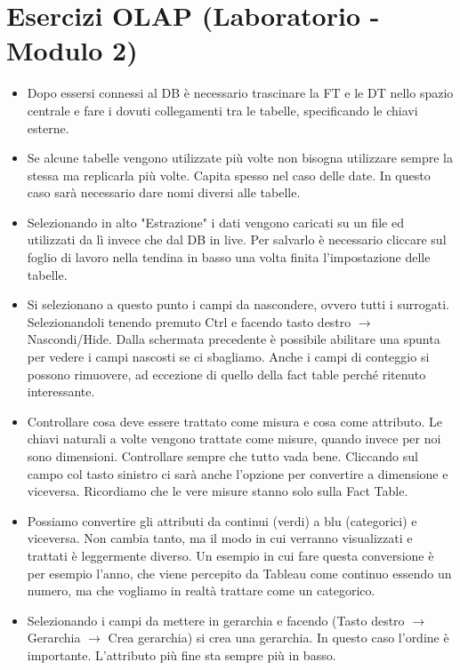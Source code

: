 \section{Esercizi OLAP (Laboratorio - Modulo 2)}
\begin{itemize}
	\item Dopo essersi connessi al DB è necessario trascinare la FT e le DT nello spazio centrale e fare i dovuti collegamenti tra le tabelle, specificando le chiavi esterne.
	\item Se alcune tabelle vengono utilizzate più volte non bisogna utilizzare sempre la stessa ma replicarla più volte. Capita spesso nel caso delle date. In questo caso sarà necessario dare nomi diversi alle tabelle.
	\item Selezionando in alto "Estrazione" i dati vengono caricati su un file ed utilizzati da lì invece che dal DB in live. Per salvarlo è necessario cliccare sul foglio di lavoro nella tendina in basso una volta finita l'impostazione delle tabelle.
	\item Si selezionano a questo punto i campi da nascondere, ovvero tutti i surrogati. Selezionandoli tenendo premuto Ctrl e facendo tasto destro $\xrightarrow{}$ Nascondi/Hide. Dalla schermata precedente è possibile abilitare una spunta per vedere i campi nascosti se ci sbagliamo. Anche i campi di conteggio si possono rimuovere, ad eccezione di quello della fact table perché ritenuto interessante.
	\item Controllare cosa deve essere trattato come misura e cosa come attributo. Le chiavi naturali a volte vengono trattate come misure, quando invece per noi sono dimensioni. Controllare sempre che tutto vada bene. Cliccando sul campo col tasto sinistro ci sarà anche l'opzione per convertire a dimensione e viceversa. Ricordiamo che le vere misure stanno solo sulla Fact Table.
	\item Possiamo convertire gli attributi da continui (verdi) a blu (categorici) e viceversa. Non cambia tanto, ma il modo in cui verranno visualizzati e trattati è leggermente diverso. Un esempio in cui fare questa conversione è per esempio l'anno, che viene percepito da Tableau come continuo essendo un numero, ma che vogliamo in realtà trattare come un categorico.
	\item Selezionando i campi da mettere in gerarchia e facendo (Tasto destro $\xrightarrow{}$ Gerarchia $\xrightarrow{}$ Crea gerarchia) si crea una gerarchia. In questo caso l'ordine è importante. L'attributo più fine sta sempre più in basso.

\end{itemize}

